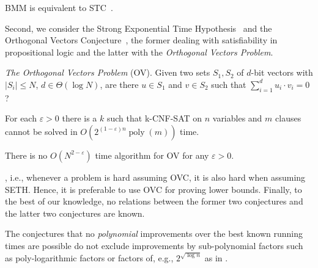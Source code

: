 \documentclass[11pt,letterpaper]{article}
\newif\iffullversion
\newcommand{\infull}[1]{\iffullversion #1\fi}
\newcommand{\inshort}[1]{\iffullversion \else #1\fi}
\begin{document}
\inshort{BMM is equivalent to STC~\cite{WilliamsW10}.}
\infull{By a result of Vassilevska~Williams and Ryan Williams~\cite{WilliamsW10}, we have that 
BMM is equivalent to the combinatorial part of STC.} 
\infull{Moreover, if we do not restrict ourselves to combinatorial algorithms, STC still gives a super-linear lower bound.}

Second, we consider the Strong Exponential Time Hypothesis~\cite{ImpagliazzoPZ01,CalabroIP09}
and the Orthogonal Vectors Conjecture~\cite{AbboudWW15}, the former dealing with satisfiability in propositional logic and the latter with 
the \emph{Orthogonal Vectors Problem}.

\emph{The Orthogonal Vectors Problem} (OV). Given two sets $S_1, S_2$ of $d$-bit 
vectors with $|S_i |\leq N$, $d \in \Theta(\log N)$, are there $u \in S_1$ 
and $v \in S_2$ such that $\sum_{i=1}^{d} u_i \cdot  v_i = 0$?

\begin{conjecture}\label{conj:seth}
For each  $\varepsilon >0$ there is a $k$ such that k-CNF-SAT on $n$ variables and $m$ clauses
cannot be solved in $O(2^{(1-\varepsilon)n} \operatorname{poly}(m))$ time.
\end{conjecture}

\begin{conjecture}\label{conj:ov}
There is no $O(N^{2-\varepsilon})$ time algorithm for \inshort{OV}\infull{the Orthogonal Vectors Problem} for any $\varepsilon > 0$.
\end{conjecture}

\infull{By a result of Williams~\cite{Williams05} 
we know that SETH implies OVC}, i.e.,
whenever a problem is hard assuming OVC, it is also hard when assuming SETH.
Hence, it is preferable to use OVC for proving lower bounds.
Finally, to the best of our knowledge, no relations between the former two conjectures and the latter two conjectures 
are known.
\begin{remark}
	The conjectures that no \emph{polynomial} improvements over the best known
	running times are possible do not exclude improvements by sub-polynomial 
	factors such as poly-logarithmic factors or factors of, e.g., $2^{\sqrt{\log n}}$
	as in \cite{Williams14a}.
\end{remark}
\end{document}
